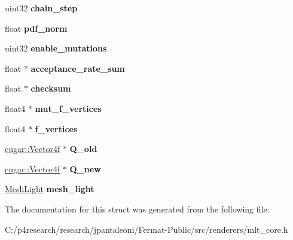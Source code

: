 \begin{DoxyCompactItemize}
uint32 {\bfseries chain\+\_\+step}
\item 
\mbox{\label{struct_m_l_t_context_a512c77839655be6b67003668ead752c8}} 
float {\bfseries pdf\+\_\+norm}
\item 
\mbox{\label{struct_m_l_t_context_a1f749d0274a77f4239ce604f5dc69f67}} 
uint32 {\bfseries enable\+\_\+mutations}
\item 
\mbox{\label{struct_m_l_t_context_a192b4ee9700bc8e21c252b32ef7bc204}} 
float $\ast$ {\bfseries acceptance\+\_\+rate\+\_\+sum}
\item 
\mbox{\label{struct_m_l_t_context_a27944801915161829fdba36ac23c327b}} 
float $\ast$ {\bfseries checksum}
\item 
\mbox{\label{struct_m_l_t_context_a94f9e4e545bb2b318c324f7e1ec2768c}} 
float4 $\ast$ {\bfseries mut\+\_\+f\+\_\+vertices}
\item 
\mbox{\label{struct_m_l_t_context_a9989a384f1dd8988a21be20df012e9c4}} 
float4 $\ast$ {\bfseries f\+\_\+vertices}
\item 
\mbox{\label{struct_m_l_t_context_a4cc8c77d0f4b08a8ddefccaf0b84c01d}} 
\hyperlink{structcugar_1_1_vector}{cugar\+::\+Vector4f} $\ast$ {\bfseries Q\+\_\+old}
\item 
\mbox{\label{struct_m_l_t_context_a250c16da263d4e879c7fa574c2fa75fd}} 
\hyperlink{structcugar_1_1_vector}{cugar\+::\+Vector4f} $\ast$ {\bfseries Q\+\_\+new}
\item 
\mbox{\label{struct_m_l_t_context_aa4edb6bcfbb071b88110f7ca28b25300}} 
\hyperlink{struct_mesh_light}{Mesh\+Light} {\bfseries mesh\+\_\+light}
\end{DoxyCompactItemize}


The documentation for this struct was generated from the following file\+:\begin{DoxyCompactItemize}
\item 
C\+:/p4research/research/jpantaleoni/\+Fermat-\/\+Public/src/renderers/mlt\+\_\+core.\+h\end{DoxyCompactItemize}
